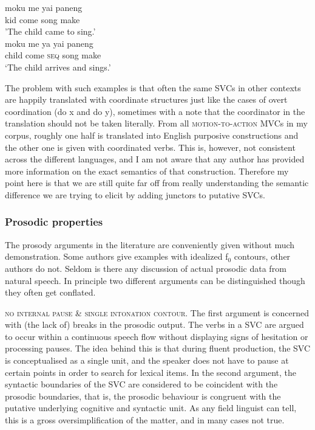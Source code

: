 \ea \label{}
\ea
\gll moku me yai paneng \\
kid come song make \\
\glft 'The child came to sing.’ \\ 
\ex
\gll moku me ya yai paneng \\ 
child come \textsc{seq} song make \\
\glft `The child arrives and sings.’\\ 
\z
\z

The problem with such examples is that often the same SVCs in other contexts are happily translated with coordinate structures just like the cases of overt coordination (do x and do y), sometimes with a note that the coordinator in the translation should not be taken literally. From all \textsc{motion-to-action} MVCs in my corpus, roughly one half is translated into English purposive constructions and the other one is given with coordinated verbs. This is, however, not consistent across the different languages, and I am not aware that any author has provided more information on the exact semantics of that construction. Therefore my point here is that we are still quite far off from really understanding the semantic difference we are trying to elicit by adding junctors to putative SVCs. 

\subsubsection{Prosodic properties} \label{sec:prosodic}

The prosody arguments in the literature are conveniently given without much demonstration. Some authors give examples with idealized f$_0$ contours, other authors do not. Seldom is there any discussion of actual prosodic data from natural speech. In principle two different arguments can be distinguished though they often get conflated. 

\textsc{no internal pause} \& \textsc{single intonation contour}. The first argument is concerned with (the lack of) breaks in the prosodic output. The verbs in a SVC are argued to occur within a continuous speech flow without displaying signs of hesitation or processing pauses. The idea behind this is that during fluent production, the SVC is conceptualised as a single unit, and the speaker does not have to pause at certain points in order to search for lexical items. In the second argument, the syntactic boundaries of the SVC are considered to be coincident with the prosodic boundaries, that is, the prosodic behaviour is congruent with the putative underlying cognitive and syntactic unit. As any field linguist can tell, this is a gross oversimplification of the matter, and in many cases not true.

